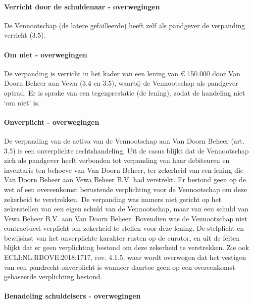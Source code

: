 \documentclass[
  dutch,
  a4paper,
]{article}
\begin{document}
\paragraph{Verricht door de schuldenaar - overwegingen}\label{verricht-door-de-schuldenaar---overwegingen-3}

De Vennootschap (de latere gefailleerde) heeft zelf als pandgever de verpanding verricht (3.5).

\paragraph{Om niet - overwegingen}\label{om-niet---overwegingen-3}

De verpanding is verricht in het kader van een lening van € 150.000 door Van Doorn Beheer aan Vewa (3.4 en 3.5), waarbij de Vennootschap als pandgever optrad. Er is sprake van een tegenprestatie (de lening), zodat de handeling niet `om niet' is.

\paragraph{Onverplicht - overwegingen}\label{onverplicht---overwegingen-3}

De verpanding van de activa van de Vennootschap aan Van Doorn Beheer (art. 3.5) is een onverplichte rechtshandeling. Uit de casus blijkt dat de Vennootschap zich als pandgever heeft verbonden tot verpanding van haar debiteuren en inventaris ten behoeve van Van Doorn Beheer, ter zekerheid van een lening die Van Doorn Beheer aan Vewa Beheer B.V. had verstrekt. Er bestond geen op de wet of een overeenkomst berustende verplichting voor de Vennootschap om deze zekerheid te verstrekken. De verpanding was immers niet gericht op het zekerstellen van een eigen schuld van de Vennootschap, maar van een schuld van Vewa Beheer B.V. aan Van Doorn Beheer. Bovendien was de Vennootschap niet contractueel verplicht om zekerheid te stellen voor deze lening. De stelplicht en bewijslast van het onverplichte karakter rusten op de curator, en uit de feiten blijkt dat er geen verplichting bestond om deze zekerheid te verstrekken. Zie ook ECLI:NL:RBOVE:2018:1717, rov. 4.1.5, waar wordt overwogen dat het vestigen van een pandrecht onverplicht is wanneer daartoe geen op een overeenkomst gebaseerde verplichting bestond.

\paragraph{Benadeling schuldeisers - overwegingen}\label{benadeling-schuldeisers---overwegingen-3}
\end{document}
